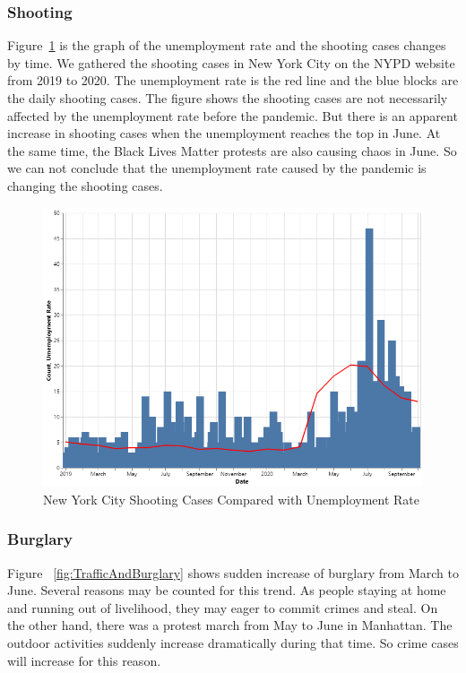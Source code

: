 \documentclass[conference]{IEEEtran}
\begin{document}
\subsubsection{Shooting}
Figure~\ref{fig:Shooting&UER} is the graph of the unemployment rate and the shooting cases changes by time. We gathered the shooting cases in New York City on the NYPD website from 2019 to 2020. The unemployment rate is the red line and the blue blocks are the daily shooting cases. The figure shows the shooting cases are not necessarily affected by the unemployment rate before the pandemic. But there is an apparent increase in shooting cases when the unemployment reaches the top in June. At the same time, the Black Lives Matter protests are also causing chaos in June. So we can not conclude that the unemployment rate caused by the pandemic is changing the shooting cases.



\begin{figure}[ht!]
    \centering
    \includegraphics[width=\linewidth]{images/Shooting&UER.png}
    \caption{New York City Shooting Cases Compared with Unemployment Rate}
    \label{fig:Shooting&UER}
\end{figure}

\subsubsection{Burglary}
Figure ~\ref{fig:TrafficAndBurglary} shows sudden increase of burglary from March to June. Several reasons may be counted for this trend. As people staying at home and running out of livelihood, they may eager to commit crimes and steal. On the other hand, there was a protest march from May to June in Manhattan. The outdoor activities suddenly increase dramatically during that time. So crime cases will increase for this reason.
\end{document}
